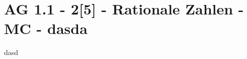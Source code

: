 \section{AG 1.1 - 2[5] - Rationale Zahlen - MC - dasda}

\begin{beispiel}[AG 1.1]{1}
dasd
\end{beispiel}